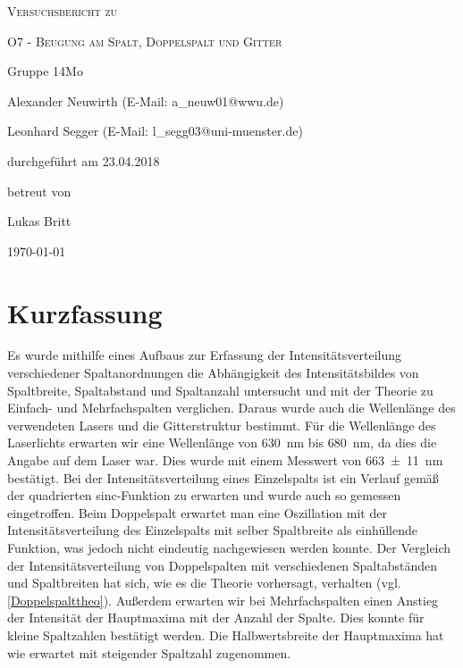 \documentclass[
	a4paper,
	12pt,
	pagesize,
	ngerman
]{scrartcl}
\begin{document}
	
	\begin{titlepage}
		\centering
		{\scshape\LARGE Versuchsbericht zu \par}
		\vspace{1cm}
		{\scshape\huge O7 - Beugung am Spalt, Doppelspalt und Gitter \par} %
		\vspace{2.5cm}
		{\LARGE Gruppe 14Mo \par}
		\vspace{0.5cm}
		
		{\large Alexander Neuwirth (E-Mail: a\_neuw01@wwu.de) \par}
		{\large Leonhard Segger (E-Mail: l\_segg03@uni-muenster.de) \par}
		\vfill
		
		durchgeführt am 23.04.2018\par %
		betreut von\par
		{\large Lukas Britt} %
		
		\vfill
		
		{\large \today\par}
	\end{titlepage}
	\tableofcontents
	\newpage

	\section{Kurzfassung}
	
	Es wurde mithilfe eines Aufbaus zur Erfassung der Intensitätsverteilung verschiedener Spaltanordnungen die Abhängigkeit des Intensitätsbildes von Spaltbreite, Spaltabstand und Spaltanzahl untersucht und mit der Theorie zu Einfach- und Mehrfachspalten verglichen.
	Daraus wurde auch die Wellenlänge des verwendeten Lasers und die Gitterstruktur bestimmt.
	Für die Wellenlänge des Laserlichts erwarten wir eine Wellenlänge von \SI{630}{\nano \meter} bis \SI{680}{\nano \meter}, da dies die Angabe auf dem Laser war.
	Dies wurde mit einem Messwert von \SI{663 \pm 11}{nm} bestätigt.
	Bei der Intensitätsverteilung eines Einzelspalts ist ein Verlauf gemäß der quadrierten sinc-Funktion zu erwarten und wurde auch so gemessen eingetroffen.
	Beim Doppelspalt erwartet man eine Oszillation mit der Intensitätsverteilung des Einzelspalts mit selber Spaltbreite als einhüllende Funktion, was jedoch nicht eindeutig nachgewiesen werden konnte.
	Der Vergleich der Intensitätsverteilung von Doppelspalten mit verschiedenen Spaltabständen und Spaltbreiten hat sich, wie es die Theorie vorhersagt, verhalten (vgl. \cref{Doppelspalttheo}). 
	Außerdem erwarten wir bei Mehrfachspalten einen Anstieg der Intensität der Hauptmaxima mit der Anzahl der Spalte.
	Dies konnte für kleine Spaltzahlen bestätigt werden.
	Die Halbwertsbreite der Hauptmaxima hat wie erwartet mit steigender Spaltzahl zugenommen.
	
\end{document}
